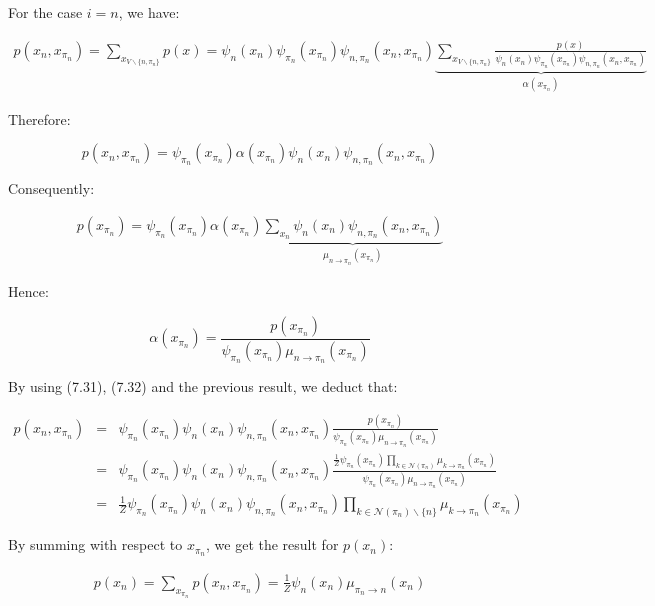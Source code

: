 \documentclass[12pt,a4paper]{report}
\begin{document}
For the case $i=n$, we have:

\begin{eqnarray*}
p(x_n,x_{\pi_n})= \sum_{x_{V\backslash\{n,\pi_n\}}}p(x)=\psi_n(x_n)\psi_{\pi_n}(x_{\pi_n})\psi_{n,\pi_n}
(x_n,x_{\pi_n}) \underbrace{\sum_{x_{V\backslash\{n,\pi_n\}}}\frac{p(x)}{\psi_n(x_n)\psi_{\pi_n}
(x_{\pi_n})\psi_{n,\pi_n}(x_n,x_{\pi_n})}}_{\alpha(x_{\pi_n})}
\end{eqnarray*}

Therefore:

\begin{equation}
	p(x_n,x_{\pi_n}) = \psi_{\pi_n}(x_{\pi_n})\alpha(x_{\pi_n})\psi_n(x_n)\psi_{n,\pi_n} (x_n,x_{\pi_n})
\end{equation}

Consequently:

\begin{eqnarray*}
	p(x_{\pi_n}) = \psi_{\pi_n}(x_{\pi_n})\alpha(x_{\pi_n})\underbrace{\sum_{x_n}\psi_n(x_n)\psi_{n,\pi_n} (x_n,x_{\pi_n})}_{\mu_{n \rightarrow\pi_n}(x_{\pi_n})}
\end{eqnarray*}

Hence:

\begin{equation}
\alpha(x_{\pi_n}) = \frac{p(x_{\pi_n})}{\psi_{\pi_n}(x_{\pi_n})\mu_{n\rightarrow\pi_n}(x_{\pi_n})}
\end{equation}

By using (7.31), (7.32) and the previous result, we deduct that:

\begin{eqnarray*}
	p(x_n,x_{\pi_n}) 	& = & \psi_{\pi_n}(x_{\pi_n})\psi_n(x_n)\psi_{n,\pi_n}(x_n,x_{\pi_n}) \frac{p(x_{\pi_n})}{\psi_{\pi_n}(x_{\pi_n})\mu_{n\rightarrow\pi_n}(x_{\pi_n})} \\
					& = &  \psi_{\pi_n}(x_{\pi_n})\psi_n(x_n)\psi_{n,\pi_n}(x_n,x_{\pi_n})
						\frac{\frac{1}{Z}{\psi}_{\pi_n}(x_{\pi_n})  \prod_{k \in \mathcal{{N}}(\pi_n) }
						\mu_{k\rightarrow\pi_n}(x_{\pi_n})}{\psi_{\pi_n}(x_{\pi_n})\mu_{n\rightarrow\pi_n}(x_{\pi_n})}\\
					& = &  \frac{1}{Z}\psi_{\pi_n}(x_{\pi_n})\psi_n(x_n)\psi_{n,\pi_n}(x_n,x_{\pi_n})
						\prod_{k \in \mathcal{{N}}(\pi_n)\backslash\{n\}}\mu_{k\rightarrow\pi_n}(x_{\pi_n})
\end{eqnarray*}

By summing with respect to $x_{\pi_n}$, we get the result for $p(x_n)$:

\begin{eqnarray*}
p(x_n) = \sum_{x_{\pi_n}}p(x_n,x_{\pi_n}) = \frac{1}{Z}\psi_n(x_n)\mu_{\pi_n\rightarrow n}(x_n)
\end{eqnarray*}
\end{document}
